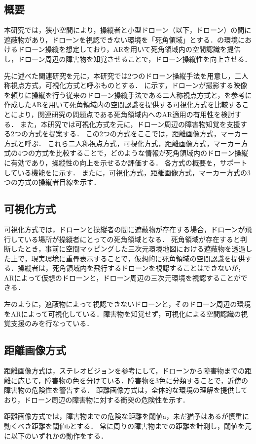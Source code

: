 \documentclass[submit, sigrecommended]{ipsj}
\begin{document}
\subsection{概要}
本研究では，狭小空間により，操縦者と小型ドローン（以下，ドローン）の間に遮蔽物があり，ドローンを視認できない環境を「死角領域」とする．の環境におけるドローン操縦を想定しており，ARを用いて死角領域内の空間認識を提供し，ドローン周辺の障害物を知覚させることで，ドローン操縦性を向上させる．
\par
先に述べた関連研究\cite{article-ar05}を元に，本研究では2つのドローン操縦手法を用意し，二人称視点方式，可視化方式と呼ぶものとする．
に示す，ドローンが撮影する映像を頼りに操縦を行う従来のドローン操縦手法である二人称視点方式と，を参考に作成したARを用いて死角領域内の空間認識を提供する可視化方式を比較することにより，関連研究の問題点である死角領域内へのAR適用の有用性を検討する．
また，本研究では可視化方式を元に，ドローン周辺の障害物知覚を支援する2つの方式を提案する．
この2つの方式をここでは，距離画像方式，マーカー方式と呼ぶ．
これら二人称視点方式，可視化方式，距離画像方式，マーカー方式の4つの方式を比較することで，どのような情報が死角領域内のドローン操縦に有効であり，操縦性の向上を示せるか評価する．
各方式の概要を，サポートしている機能をに示す．
またに，可視化方式，距離画像方式，マーカー方式の3つの方式の操縦者目線を示す．

\subsection{可視化方式}
可視化方式では，ドローンと操縦者の間に遮蔽物が存在する場合，ドローンが飛行している場所が操縦者にとっての死角領域となる．
死角領域が存在すると判断したとき，事前に空間マッピングした三次元環境地図における遮蔽物を透過した上で，現実環境に重畳表示することで，仮想的に死角領域の空間認識を提供する．操縦者は，死角領域内を飛行するドローンを視認することはできないが，ARによって仮想のドローンと，ドローン周辺の三次元環境を視認することができる．
\par
{}左のように，遮蔽物によって視認できないドローンと，そのドローン周辺の環境をARによって可視化している．障害物を知覚せず，可視化による空間認識の視覚支援のみを行なっている．


\subsection{距離画像方式}
距離画像方式は，ステレオビジョンを参考にして，ドローンから障害物までの距離に応じて，障害物の色を分けている．障害物を3色に分類することで，近傍の障害物の危険性を警告する．
距離画像方式は，全体的な環境の理解を提供しており，ドローン周辺の障害物に対する衝突の危険性を示す．
\par
距離画像方式では，障害物までの危険な距離を閾値a，未だ猶予はあるが慎重に動くべき距離を閾値bとする．
常に周りの障害物までの距離を計測し，閾値を元に以下のいずれかの動作をする．
\end{document}
